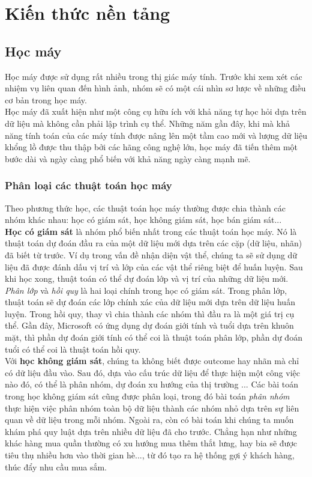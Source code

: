 \chapter{Kiến thức nền tảng}
\section{Học máy}

Học máy được sử dụng rất nhiều trong thị giác máy tính. Trước khi xem xét các nhiệm vụ liên quan đến hình ảnh, nhóm sẽ có một cái nhìn sơ lược về những điều cơ bản trong học máy.\\

Học máy đã xuất hiện như một công cụ hữu ích với khả năng tự học hỏi dựa trên dữ liệu mà không cần phải lập trình cụ thể. Những năm gần đây, khi mà khả năng tính toán của các máy tính được nâng lên một tầm cao mới và lượng dữ liệu khổng lồ được thu thập bởi các hãng công nghệ lớn, học máy đã tiến thêm một bước dài và ngày càng phổ biến với khả năng ngày càng mạnh mẽ.


\subsection{Phân loại các thuật toán học máy}

Theo phương thức học, các thuật toán học máy thường được chia thành các nhóm khác nhau: học có giám sát, học không giám sát, học bán giám sát...\\

\textbf{Học có giám sát} là nhóm phổ biến nhất trong các thuật toán học máy. Nó là thuật toán dự đoán đầu ra của một dữ liệu mới dựa trên các cặp (dữ liệu, nhãn) đã biết từ trước. Ví dụ trong vấn đề nhận diện vật thể, chúng ta sẽ sử dụng dữ liệu đã được đánh dấu vị trí và lớp của các vật thể riêng biệt để huấn luyện. Sau khi học xong, thuật toán có thể dự đoán lớp và vị trí của những dữ liệu mới. \textit{Phân lớp} và \textit{hồi quy} là hai loại chính trong học có giám sát. Trong phân lớp, thuật toán sẽ dự đoán các lớp chính xác của dữ liệu mới dựa trên dữ liệu huấn luyện. Trong hồi quy, thay vì chia thành các nhóm thì đầu ra là một giá trị cụ thể. Gần đây, Microsoft có ứng dụng dự đoán giới tính và tuổi dựa trên khuôn mặt, thì phần dự đoán giới tính có thể coi là thuật toán phân lớp, phần dự đoán tuổi có thể coi là thuật toán hồi quy.\\

Với \textbf{học không giám sát}, chúng ta không biết được outcome hay nhãn mà chỉ có dữ liệu đầu vào. Sau đó, dựa vào cấu trúc dữ liệu để thực hiện một công việc nào đó, có thể là phân nhóm, dự đoán xu hướng của thị trường ... Các bài toán trong học không giám sát cũng được phân loại, trong đó bài toán \textit{phân nhóm} thực hiện việc phân nhóm toàn bộ dữ liệu thành các nhóm nhỏ dựa trên sự liên quan về dữ liệu trong mỗi nhóm. Ngoài ra, còn có bài toán khi chúng ta muốn khám phá quy luật dựa trên nhiều dữ liệu đã cho trước. Chẳng hạn như những khác hàng mua quần thường có xu hướng mua thêm thắt lưng, hay bia sẽ được tiêu thụ nhiều hơn vào thời gian hè..., từ đó tạo ra hệ thống gợi ý khách hàng, thúc đẩy nhu cầu mua sắm.

